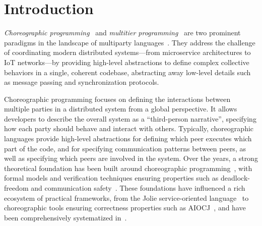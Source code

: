 \documentclass[runningheads]{llncs}
\newcommand{\diff}[1]{{#1}}
\begin{document}
\section{Introduction}\label{sec:intro}

\diff{
\emph{Choreographic programming}~\cite{montesi2014choreographic,DBLP:journals/ftpl/AnconaBB0CDGGGH16} and \emph{multitier programming}~\cite{DBLP:journals/csur/WeisenburgerWS20} 
 are two prominent paradigms in the landscape of multiparty languages~\cite{DBLP:conf/ecoop/GiallorenzoMPRS21}.
%
They address the challenge of coordinating 
 modern distributed systems---from microservice architectures to IoT networks---by providing high-level abstractions 
 to define complex collective behaviors in a single, 
 coherent codebase, 
 abstracting away low-level details such as message passing and synchronization protocols.}

\diff{Choreographic programming} focuses on defining the interactions between multiple parties in a distributed system from a global perspective.
%
It allows developers to describe the overall system as a ``third-person narrative'',
specifying how each party should behave and interact with others.
%
Typically,
choreographic languages provide high-level abstractions for defining which peer executes which part of the code,
and for specifying communication patterns between peers, as well as specifying which peers are involved in the system.
%
Over the years,
a strong theoretical foundation has been built around choreographic programming~\cite{DBLP:journals/lmcs/BarbaneraLT23},
with formal models and verification techniques ensuring properties such as deadlock-freedom and communication safety~\cite{10.1145/2480359.2429101,DBLP:journals/jlp/GhilezanJPSY19}.
%
These foundations have influenced a rich ecosystem of practical frameworks, 
from the Jolie service-oriented language~\cite{DBLP:books/sp/wsf14/MontesiGZ14} to choreographic tools ensuring correctness properties such as AIOCJ~\cite{dalla2017dynamic}, 
and have been comprehensively systematized in~\cite{giallorenzo2018applied}.
\end{document}
